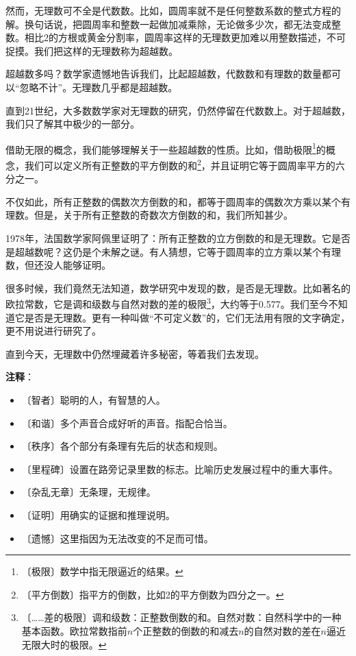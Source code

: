 \documentclass[12pt,UTF-8,openany]{ctexbook}
\begin{document}
\begin{normalsize}
    然而，无理数可不全是代数数。比如，圆周率就不是任何整数系数的整式方程的解。换句话说，把圆周率和整数一起做加减乘除，无论做多少次，都无法变成整数。相比2的方根或黄金分割率，圆周率这样的无理数更加难以用整数描述，不可捉摸。我们把这样的无理数称为超越数。
    
    超越数多吗？数学家遗憾地告诉我们，比起超越数，代数数和有理数的数量都可以“忽略不计”。无理数几乎都是超越数。
    
    直到21世纪，大多数数学家对无理数的研究，仍然停留在代数数上。对于超越数，我们只了解其中极少的一部分。
    
    借助无限的概念，我们能够理解关于一些超越数的性质。比如，借助极限\footnote{〔极限〕数学中指无限逼近的结果。}的概念，我们可以定义所有正整数的平方倒数的和\footnote{〔平方倒数〕指平方的倒数，比如2的平方倒数为四分之一。}，并且证明它等于圆周率平方的六分之一。
    
    不仅如此，所有正整数的偶数次方倒数的和，都等于圆周率的偶数次方乘以某个有理数。但是，关于所有正整数的奇数次方倒数的和，我们所知甚少。
    
    1978年，法国数学家阿佩里证明了：所有正整数的立方倒数的和是无理数。它是否是超越数呢？这仍是个未解之谜。有人猜想，它等于圆周率的立方乘以某个有理数，但还没人能够证明。
    
    很多时候，我们竟然无法知道，数学研究中发现的数，是否是无理数。比如著名的欧拉常数，它是调和级数与自然对数的差的极限\footnote{〔……差的极限〕调和级数：正整数倒数的和。自然对数：自然科学中的一种基本函数。欧拉常数指前$n$个正整数的倒数的和减去$n$的自然对数的差在$n$逼近无限大时的极限。}，大约等于0.577。我们至今不知道它是否是无理数。更有一种叫做“不可定义数”的，它们无法用有限的文字确定，更不用说进行研究了。
    
    直到今天，无理数中仍然埋藏着许多秘密，等着我们去发现。
    
\end{normalsize}


\newpage

\textbf{注释}：

\vspace{-1em}

\begin{itemize}
    \setlength\itemsep{-0.2em}
    \item 〔智者〕聪明的人，有智慧的人。
    \item 〔和谐〕多个声音合成好听的声音。指配合恰当。
    \item 〔秩序〕各个部分有条理有先后的状态和规则。
    \item 〔里程碑〕设置在路旁记录里数的标志。比喻历史发展过程中的重大事件。
    \item 〔杂乱无章〕无条理，无规律。
    \item 〔证明〕用确实的证据和推理说明。
    \item 〔遗憾〕这里指因为无法改变的不足而可惜。
\end{itemize}
\end{document}
